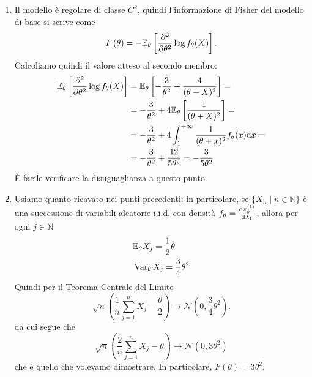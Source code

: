 \begin{soluzione}
\begin{enumerate}
  \item Il modello è regolare di classe \(C^2\), quindi l'informazione
    di Fisher del modello di base si scrive come
    \[
      I_1 (\theta) = - \mathbb E_\theta \left[ \frac{\partial^{2}}{\partial \theta^{2}} \log
        f_\theta(X) \right] .
    \]
    Calcoliamo quindi il valore atteso al secondo membro:
    \begin{align*}
      \mathbb E_\theta \left[ \frac{\partial^{2}}{\partial \theta^{2}} \log f_\theta(X) \right] &= \mathbb E_\theta \left[ -\frac{3}{\theta^2} + \frac{4}{(\theta+X)^2} \right] = \\
                                                                   &= - \frac{3}{\theta^2} + 4 \mathbb E_\theta \left[ \frac{1}{(\theta + X)^2} \right] = \\
                                                                   &= - \frac{3}{\theta^2} + 4 \int_1^{+\infty} \frac{1}{(\theta+x)^2} f_\theta (x) \mathrm dx = \\
                                                                   &= - \frac{3}{\theta^2} + \frac{12}{5\theta^2} = - \frac{3}{5\theta^2}
    \end{align*}
    È facile verificare la disuguaglianza a questo punto.
    
  \item Usiamo quanto ricavato nei punti precedenti: in particolare,
    se \(\{X_n \mid n \in \mathbb{N}\}\) è una successione di
    variabili aleatorie i.i.d. con densità
    \(f_\theta = \frac{\mathrm d \pi_\theta^{(1)}}{\mathrm d \lambda_1}\), allora per
    ogni \(j \in \mathbb{N}\)
    \begin{align*}
      & \mathbb E_\theta X_j = \frac{1}{2} \theta \\
      & \operatorname{Var}_\theta X_j = \frac{3}{4} \theta^2
    \end{align*}
    Quindi per il {\sc Teorema Centrale del Limite}
    \[
      \sqrt n \left( \frac 1 n \sum_{j=1}^nX_j - \frac{\theta}{2}
      \right) \to \mathcal{N} \left(0, \frac 3 4 \theta^2\right).
    \]
    da cui segue che
    \[
      \sqrt n \left(\frac 2 n \sum_{j=1}^nX_j - \theta \right) \to
      \mathcal{N} \left(0, 3 \theta^2\right)
    \]
    che è quello che volevamo dimostrare. In particolare,
    \(F(\theta) = 3\theta^2.\)


\end{enumerate}
\end{soluzione}
